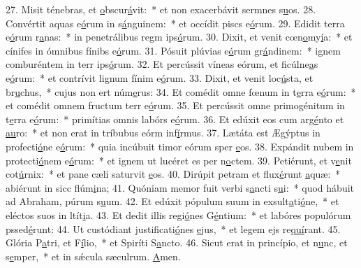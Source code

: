 27. Misit ténebras, et \uline{o}bscur\uline{á}vit:~* et non exacerbávit sermnes s\uline{u}os.
28. Convértit aquas e\uline{ó}rum in s\uline{á}nguinem:~* et occídit piscs e\uline{ó}rum.
29. Edidit terra e\uline{ó}rum r\uline{a}nas:~* in penetrálibus regm ips\uline{ó}rum.
30. Dixit, et venit cœn\uline{o}my\uline{í}a:~* et cínifes in ómnibus fínibs e\uline{ó}rum.
31. Pósuit plúvias e\uline{ó}rum gr\uline{á}ndinem:~* ignem comburéntem in terr ips\uline{ó}rum.
32. Et percússit víneas eórum, et ficúlne\uline{a}s e\uline{ó}rum:~* et contrívit lignum fínim e\uline{ó}rum.
33. Dixit, et venit loc\uline{ú}sta, et br\uline{u}chus,~* cujus non ert núm\uline{e}rus:
34. Et comédit omne fœnum in t\uline{e}rra e\uline{ó}rum:~* et comédit omnem fructum terr e\uline{ó}rum.
35. Et percússit omne primogénitum in t\uline{e}rra e\uline{ó}rum:~* primítias omnis labórs e\uline{ó}rum.
36. Et edúxit eos cum arg\uline{é}nto et \uline{au}ro:~* et non erat in tríbubus eórm inf\uline{í}rmus.
37. Lætáta est Ægýptus in profecti\uline{ó}ne e\uline{ó}rum:~* quia incúbuit timor eórum sper \uline{e}os.
38. Expándit nubem in protecti\uline{ó}nem e\uline{ó}rum:~* et ignem ut lucéret es per n\uline{o}ctem.
39. Petiérunt, et v\uline{e}nit cot\uline{ú}rnix:~* et pane cæli saturvit \uline{e}os.
40. Dirúpit petram et flux\uline{é}runt \uline{a}quæ:~* abiérunt in sicc flúm\uline{i}na;
41. Quóniam memor fuit verbi s\uline{a}ncti s\uline{u}i:~* quod hábuit ad Abraham, púrum s\uline{u}um.
42. Et edúxit pópulum suum in exsult\uline{a}ti\uline{ó}ne,~* et eléctos suos in ltít\uline{i}a.
43. Et dedit illis regi\uline{ó}nes G\uline{é}ntium:~* et labóres populórum pssed\uline{é}runt:
44. Ut custódiant justificati\uline{ó}nes \uline{e}jus,~* et legem ejs re\uline{quí}rant.
45. Glória P\uline{a}tri, et F\uline{í}lio,~* et Spiríti S\uline{a}ncto.
46. Sicut erat in princípio, et n\uline{u}nc, et s\uline{e}mper,~* et in sǽcula sæculrum. \uline{A}men.
